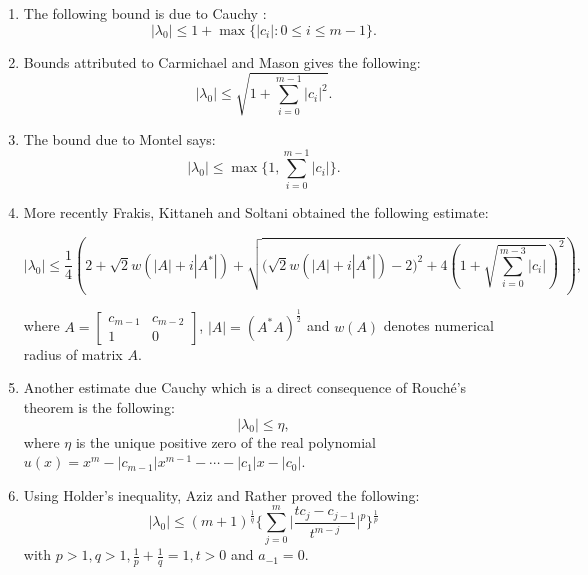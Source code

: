 \documentclass[12pt, reqno]{amsart}
\theoremstyle{definition}
\theoremstyle{remark}
\numberwithin{equation}{section}
\begin{document}
\begin{enumerate}
\item The following bound is due to Cauchy \cite{Horn-Johnson} :
\begin{equation}\label{eq-Cauchy}
|\lambda_0| \leq 1 + \max \{|c_i| : 0 \leq i \leq m-1 \}.
\end{equation}
\item Bounds attributed to Carmichael and Mason \cite{Horn-Johnson} gives the following:
\begin{equation}\label{eq-Carmichael and Mason}
|\lambda_0| \leq \displaystyle \sqrt{1+ \sum_{i=0}^{m-1}|c_i|^2}.
\end{equation}
\item The bound due to Montel \cite{Horn-Johnson} says:
\begin{equation}\label{eq-Montel}
|\lambda_0| \leq \max \Bigg\{1, \sum_{i=0}^{m-1} |c_i| \Bigg\}.
\end{equation}
\item More recently Frakis, Kittaneh and Soltani \cite{Abdelkader-Faud-Soumia} obtained 
the following estimate:
\begin{smaller}
\begin{equation}\label{eq-Frakis, Kittaneh and Soltani}
|\lambda_0| \leq  \frac{1}{4} \left(2+ \sqrt{2}w(|A|+i|A^*|)+ \sqrt{\Big(\sqrt{2}w(|A|+i|A^*|) 
-2 \Big)^2 +4 \left(1+\sqrt{\sum_{i=0}^{m-3}|c_i|}\right)^2} \right),
\end{equation}
\end{smaller}
where $A = \begin{bmatrix}
c_{m-1} & c_{m-2} \\
1 & 0
\end{bmatrix}$, $|A| = (A^*A)^{\frac{1}{2}}$ and $w(A)$ denotes numerical radius of 
matrix $A$.
\item Another estimate due Cauchy \cite{Cauchy} which is a direct consequence of 
Rouch\'e's theorem is the following:
\begin{equation}\label{eq-Cauchy-Rouche}
|\lambda_0| \leq \eta,
\end{equation}
where $\eta$ is the unique positive zero of the real polynomial $u(x) = x^m - 
|c_{m-1}|x^{m-1} - \cdots - |c_1| x -|c_0|$.
\item Using Holder's inequality, Aziz and Rather \cite{Aziz-Rather} proved the following:
\begin{equation}\label{eq-Aziz-Rather}
|\lambda_0| \leq (m+1)^{\frac{1}{q}} \Bigg \{ \displaystyle \sum_{j=0}^{m} \bigg| 
\frac{tc_j-c_{j-1}}{t^{m-j}}\bigg|^p \Bigg\} ^{\frac{1}{p}}
\end{equation}
with $p>1, q>1, \frac{1}{p}+\frac{1}{q}=1, t>0$ and $a_{-1} =0$.
\end{enumerate}
\end{document}
